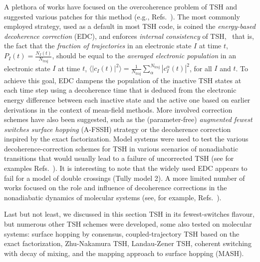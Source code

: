 \documentclass[9pt,bestpractices]{livecoms}
\begin{document}
A plethora of works have focused on the overcoherence problem of TSH and suggested various patches for this method (e.g., Refs.~).
The most commonly employed strategy, used as a default in most TSH code, is coined the \textit{energy-based decoherence correction} (EDC),\cite{granucci2010including} and enforces \textit{internal consistency} of TSH,~\cite{fang99b,Granucci2007} that is, the fact that the \textit{fraction of trajectories} in an electronic state $I$ at time $t$, $P_I(t) = \frac{N_I(t)}{N_{\text{traj}}}$, should be equal to the \textit{averaged electronic population} in an electronic state $I$ at time $t$, $\langle|c_I(t)|^2\rangle=\frac{1}{N_{\text{traj}}}\sum_\alpha^{N_{\text{traj}}} |c_I^\alpha(t)|^2$, for all $I$ and $t$. To achieve this goal, EDC dampens the population of the inactive TSH states at each time step using a decoherence time that is deduced from the electronic energy difference between each inactive state and the active one based on earlier derivations in the context of mean-field methods.\cite{Zhu2004} More involved correction schemes have also been suggested, such as the (parameter-free) \textit{augmented fewest switches surface hopping} (A-FSSH) strategy\cite{subotnik2011new,subotnik2011fewest,subotnik2016understanding} or the decoherence correction inspired by the exact factorization.\cite{min2018decoh} 
Model systems were used to test the various decoherence-correction schemes for TSH in various scenarios of nonadiabatic transitions that would usually lead to a failure of uncorrected TSH (see for examples Refs.~). It is interesting to note that the widely used EDC appears to fail for a model of double crossings (Tully model 2).\cite{falkissueedc2014} A more limited number of works focused on the role and influence of decoherence corrections in the nonadiabatic dynamics of molecular systems (see, for example, Refs.~).

Last but not least, we discussed in this section TSH in its fewest-switches flavour, but numerous other TSH schemes were developed, some also tested on molecular systems: surface hopping by consensus,\cite{martens2016surface} coupled-trajectory TSH based on the exact factorization,\cite{pieronicttsh2021} Zhu-Nakamura TSH,\cite{zhunakatsh2001,zhunakatsh2006} Landau-Zener TSH,\cite{slavicek2020} coherent switching with decay of mixing,\cite{Zhu2004,shu2020CSDMsharc} and the mapping approach to surface hopping (MASH).\cite{Mannouch2023,richardson2025mash}
\end{document}

